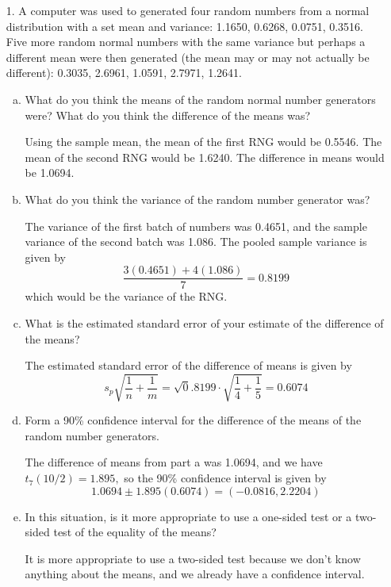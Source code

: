 \documentclass{article}
\begin{document}
\begin{itemize}
	\item[1.] A computer was used to generated four random numbers from a normal distribution with a set mean and variance: 1.1650, 0.6268, 0.0751, 0.3516. Five more random normal numbers with the same variance but perhaps a different mean were then generated (the mean may or may not actually be different): 0.3035, 2.6961, 1.0591, 2.7971, 1.2641.
		\begin{enumerate}[a.]
			\item What do you think the means of the random normal number generators were? What do you think the difference of the means was?
				\begin{soln}
					Using the sample mean, the mean of the first RNG would be 0.5546. The mean of the second RNG would be 1.6240. The difference in means would be 1.0694.
				\end{soln}

			\item What do you think the variance of the random number generator was?
				\begin{soln}
					The variance of the first batch of numbers was 0.4651, and the sample variance of the second batch was 1.086. The pooled sample variance is given by \[\frac{3(0.4651) + 4(1.086)}{7} = 0.8199\] which would be the variance of the RNG.
				\end{soln}

			\item What is the estimated standard error of your estimate of the difference of the means?
				\begin{soln}
					The estimated standard error of the difference of means is given by \[s_p\sqrt{\frac{1}{n}+\frac{1}{m}} = \sqrt0.8199\cdot\sqrt{\frac{1}{4} + \frac{1}{5}} = 0.6074\]
				\end{soln}

			\item Form a 90\% confidence interval for the difference of the means of the random number generators.
				\begin{soln}
					The difference of means from part a was 1.0694, and we have $t_7(10/2)=1.895,$ so the 90\% confidence interval is given by \[1.0694\pm 1.895(0.6074)= (-0.0816, 2.2204)\]
				\end{soln}

			\item In this situation, is it more appropriate to use a one-sided test or a two-sided test of the equality of the means?
				\begin{answer*}
					It is more appropriate to use a two-sided test because we don't know anything about the means, and we already have a confidence interval.
				\end{answer*}


\end{enumerate}
\end{itemize}
\end{document}
